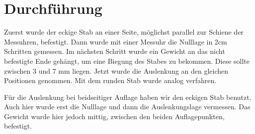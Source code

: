 \section{Durchführung}
\label{sec:Durchführung}
Zuerst wurde der eckige Stab an einer Seite,
möglichst parallel zur Schiene der Messuhren,
befestigt. Dann wurde mit einer Messuhr die Nulllage
in 2cm Schritten gemessen.
Im nächsten Schritt wurde ein Gewicht an das nicht befestigte Ende gehängt,
um eine Biegung des Stabes zu bekommen.
Diese sollte zwischen 3 und 7 mm liegen.
Jetzt wurde die Auslenkung an den gleichen Positionen genommen.
Mit dem runden Stab wurde analog verfahren.

Für die Auslenkung bei beidseitiger Auflage haben wir den eckigen Stab benutzt.
Auch hier wurde erst die Nulllage und dann die Auslenkungslage vermessen.
Das Gewicht wurde hier jedoch mittig,
zwischen den beiden Auflagepunkten, befestigt.
